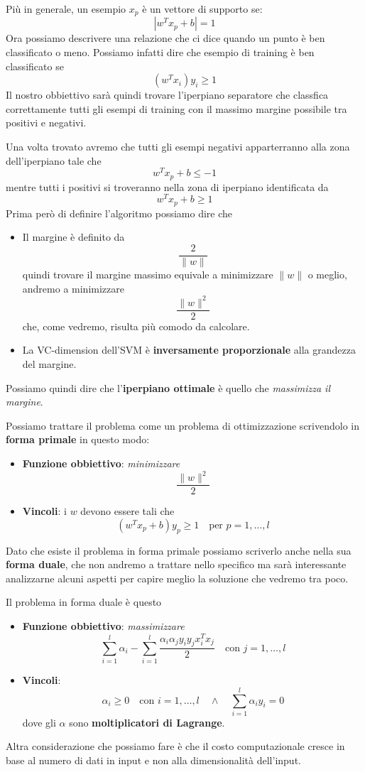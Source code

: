Pi\`u in generale, un esempio $x_p$ \`e un vettore di supporto se:
\[ | w^T x_p + b | = 1 \]
Ora possiamo descrivere una relazione che ci dice quando un punto \`e ben classificato o meno. Possiamo infatti dire che
esempio di training \`e ben classificato se
\[ (w^T x_i) y_i \geq 1 \]
Il nostro obbiettivo sar\`a quindi trovare l'iperpiano separatore che classfica correttamente tutti gli esempi di training
con il massimo margine possibile tra positivi e negativi.

Una volta trovato avremo che tutti gli esempi negativi apparterranno alla zona dell'iperpiano tale che
\[ w^T x_p + b \leq -1 \]
mentre tutti i positivi si troveranno nella zona di iperpiano identificata da
\[ w^T x_p + b \geq 1 \]
Prima per\`o di definire l'algoritmo possiamo dire che
\begin{itemize}
	\item Il margine \`e definito da
	      \[ \frac{2}{\| w \|} \]
	      quindi trovare il margine massimo equivale a minimizzare $\| w \|$ o meglio, andremo a minimizzare
	      \[\frac{\| w \|^2}{2}\]
	      che, come vedremo, risulta pi\`u comodo da calcolare.
	\item La VC-dimension dell'SVM \`e \textbf{inversamente proporzionale} alla grandezza del margine.
\end{itemize}
Possiamo quindi dire che l'\textbf{iperpiano ottimale} \`e quello che \emph{massimizza il margine}.

Possiamo trattare il problema come un problema di ottimizzazione scrivendolo in \textbf{forma primale} in questo modo:
\begin{itemize}
	\item \textbf{Funzione obbiettivo}: \emph{minimizzare}
	      \[ \frac{\| w \|^2}{2} \]
	\item \textbf{Vincoli}: i $w$ devono essere tali che
	      \[ (w^T x_p + b) y_p \geq 1 \quad \text{per } p = 1, \dots, l \]
\end{itemize}
Dato che esiste il problema in forma primale possiamo scriverlo anche nella sua \textbf{forma duale}, che non andremo a
trattare nello specifico ma sar\`a interessante analizzarne alcuni aspetti per capire meglio la soluzione che vedremo
tra poco.

Il problema in forma duale \`e questo
\begin{itemize}
	\item \textbf{Funzione obbiettivo}: \emph{massimizzare}
	      \[
		      \sum_{i=1}^l \alpha_i - \sum_{i=1}^l \frac{\alpha_i \alpha_j y_i y_j x_i^T x_j}{2}
		      \quad
		      \text{con } j = 1, \dots, l
	      \]
	\item \textbf{Vincoli}:
	      \[
		      \alpha_i \geq 0 \quad \text{con } i = 1, \dots, l
		      \quad \wedge \quad
		      \sum_{i=1}^l \alpha_i y_i = 0
	      \]
	      dove gli $\alpha$ sono \textbf{moltiplicatori di Lagrange}.
\end{itemize}
Altra considerazione che possiamo fare \`e che il costo computazionale cresce in base al numero di dati in input e non
alla dimensionalit\`a dell'input.

